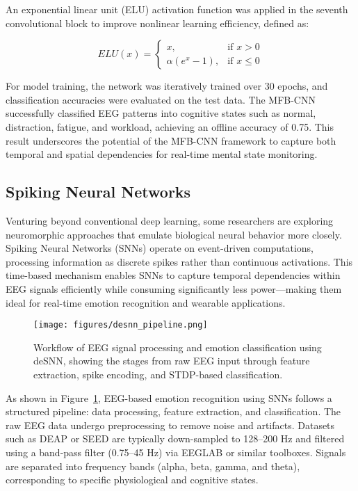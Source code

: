 \documentclass[conference]{IEEEtran}
\begin{document}
An exponential linear unit (ELU) activation function was applied in the seventh convolutional block to improve nonlinear learning efficiency, defined as:

\begin{equation}
ELU(x) =
\begin{cases}
x, & \text{if } x > 0 \\
\alpha (e^{x} - 1), & \text{if } x \leq 0
\end{cases}
\end{equation}

For model training, the network was iteratively trained over 30 epochs, and classification accuracies were evaluated on the test data. The MFB-CNN successfully classified EEG patterns into cognitive states such as normal, distraction, fatigue, and workload, achieving an offline accuracy of 0.75. This result underscores the potential of the MFB-CNN framework to capture both temporal and spatial dependencies for real-time mental state monitoring.


\subsection{Spiking Neural Networks}
Venturing beyond conventional deep learning, some researchers are exploring neuromorphic approaches that emulate biological neural behavior more closely. Spiking Neural Networks (SNNs) \cite{b5} operate on event-driven computations, processing information as discrete spikes rather than continuous activations. This time-based mechanism enables SNNs to capture temporal dependencies within EEG signals efficiently while consuming significantly less power—making them ideal for real-time emotion recognition and wearable applications.

\begin{figure}[H]
    \centering
    \texttt{[image: figures/desnn\_pipeline.png]}
    \caption{Workflow of EEG signal processing and emotion classification using deSNN, showing the stages from raw EEG input through feature extraction, spike encoding, and STDP-based classification.}
    \label{fig:desnn_pipeline}
\end{figure}

As shown in Figure~\ref{fig:desnn_pipeline}, EEG-based emotion recognition using SNNs follows a structured pipeline: data processing, feature extraction, and classification. The raw EEG data undergo preprocessing to remove noise and artifacts. Datasets such as DEAP or SEED are typically down-sampled to 128–200 Hz and filtered using a band-pass filter (0.75–45 Hz) via EEGLAB or similar toolboxes. Signals are separated into frequency bands (alpha, beta, gamma, and theta), corresponding to specific physiological and cognitive states.
\end{document}
